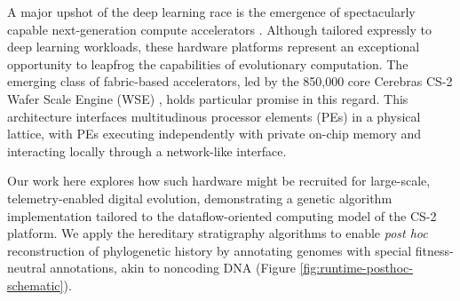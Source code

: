 A major upshot of the deep learning race is the emergence of spectacularly capable next-generation compute accelerators \citep{zhang2016cambricon,emani2021accelerating,jia2019dissecting,medina2020habana}.
Although tailored expressly to deep learning workloads, these hardware platforms represent an exceptional opportunity to leapfrog the capabilities of evolutionary computation.
The emerging class of fabric-based accelerators, led by the 850,000 core Cerebras CS-2 Wafer Scale Engine (WSE) \citep{lauterbach2021path}, holds particular promise in this regard.
This architecture interfaces multitudinous processor elements (PEs) in a physical lattice, with PEs executing independently with private on-chip memory and interacting locally through a network-like interface.

Our work here explores how such hardware might be recruited for large-scale, telemetry-enabled digital evolution, demonstrating a genetic algorithm implementation tailored to the dataflow-oriented computing model of the CS-2 platform.
We apply the hereditary stratigraphy algorithms to enable \textit{post hoc} reconstruction of phylogenetic history by annotating genomes with special fitness-neutral annotations, akin to noncoding DNA \citep{moreno2022hereditary} (Figure \ref{fig:runtime-posthoc-schematic}).




